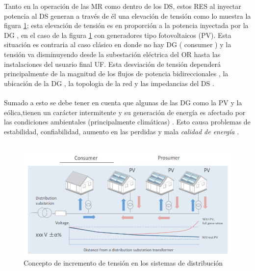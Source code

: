 \documentclass[12pt, letterpaper]{report}
\begin{document}
Tanto en la operación de las  \ac{MR} como dentro de los \ac{DS}, estos \ac{RES}  al inyectar potencia  al \ac{DS}  generan a través de  él  una elevación de tensión \cite{GSGF2015} como lo muestra la figura \ref{fig:ejemplo_control_de_tension}; esta elevación de tensión es en proporción a la potencia inyectada por la \ac{DG} , en el caso  de la figura \ref{fig:ejemplo_control_de_tension} con generadores tipo fotovoltaicos  (\ac{PV}). Esta situación es contraria al caso clásico en donde no hay \ac{DG} ( consumer ) y la tensión va disminuyendo desde la subestación eléctrica del OR hasta las instalaciones del usuario final \ac{UF}. Esta desviación de tensión  dependerá principalmente de la magnitud de los flujos de potencia bidireccionales \cite{Koutsoukis2017}, la ubicación de la \ac{DG} \cite{Othman2016a}, la topologia de la red y las impedancias del \ac{DS} .\\\\
Sumado a esto se debe tener en cuenta que algunas de las \ac{DG} como la \ac{PV} y la eólica,tienen un carácter  intermitente y su generación de energía  es afectado por  las condiciones ambientales (principalmente climáticas) \cite{Mahmud2016}. Esto causa problemas de estabilidad, confiabilidad, aumento en las perdidas y mala \textit{calidad de energía} \cite{Karanki2014}\cite{DinakaraPrasadReddy2017}.\\\\

 \begin{figure}[H]
 	\centering
 	\includegraphics[width=0.7\linewidth]{imagenes/ejemplo_control_de_tension}
 	\caption{Concepto de incremento de tensión en los sistemas de distribución \cite{GSGF2015} }
 	\label{fig:ejemplo_control_de_tension}
 \end{figure}
 
\end{document}
